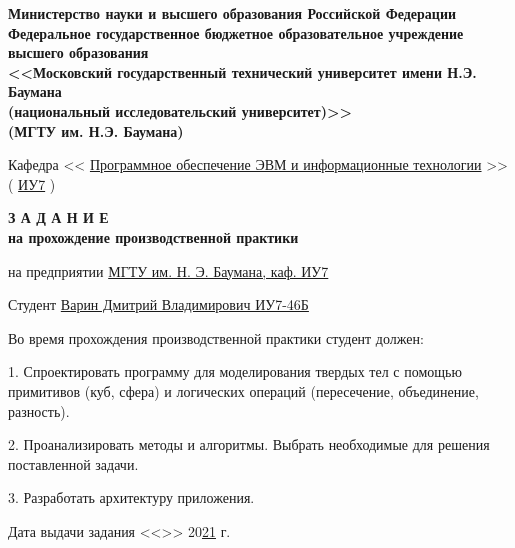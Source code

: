 \thispagestyle{empty}
\begin{center}
    \fontsize{11pt}{0.3\baselineskip}\selectfont \textbf{Министерство науки и высшего образования Российской Федерации \\ Федеральное государственное бюджетное образовательное учреждение \\ высшего образования \\ <<Московский государственный технический университет имени Н.Э. Баумана \\ (национальный исследовательский университет)>> \\ (МГТУ им. Н.Э. Баумана)}
    \makebox[\linewidth]{\rule{\textwidth}{3pt}}
    \makebox[\linewidth]{\rule{\textwidth}{3pt}}
    
    \vspace{\baselineskip}

    \fontsize{12pt}{\baselineskip}\selectfont 

    Кафедра << \uline{Программное обеспечение ЭВМ и информационные технологии} >> ( \uline{ИУ7} )
\end{center}


\begin{center}
    \fontsize{18pt}{\baselineskip}\selectfont \textbf{З А Д А Н И Е}\\
    \fontsize{16pt}{\baselineskip}\selectfont \textbf{на прохождение производственной практики}
\end{center}

\normalsize

\begingroup
\fontsize{12pt}{1\baselineskip}\selectfont
\setlength{\parindent}{0em}
на предприятии \uline{\hfill МГТУ им. Н. Э. Баумана, каф. ИУ7 \hfill}

Студент \uline{\hfill Варин Дмитрий Владимирович ИУ7-46Б \hfill}

Во время прохождения производственной практики студент должен:

1. Спроектировать программу для моделирования твердых тел с помощью примитивов (куб, сфера) и логических операций (пересечение, объединение, разность).  

2. Проанализировать методы и алгоритмы. Выбрать необходимые для решения поставленной задачи.

3. Разработать архитектуру приложения. 

\vfill

Дата выдачи задания
 <<\uline{\mbox{\hspace*{5mm}}}>> \uline{\mbox{\hspace*{2.5cm}}} 20\uline{21} г.

